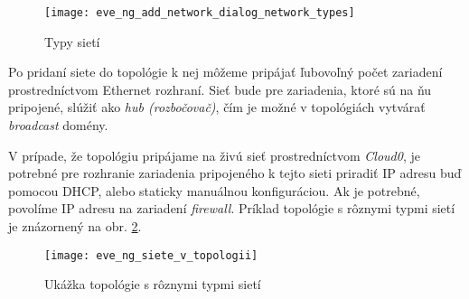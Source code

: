 \begin{figure}
    \centering
    \texttt{[image: eve\_ng\_add\_network\_dialog\_network\_types]}
    \caption{Typy sietí}
    \label{obr:eve_ng_add_network_dialog_network_types}
\end{figure}

Po pridaní siete do topológie k nej môžeme pripájať ľubovoľný počet zariadení prostredníctvom Ethernet rozhraní. Sieť bude pre zariadenia, ktoré sú na ňu pripojené, slúžiť ako \emph{hub (rozbočovač)}, čím je možné v topológiách vytvárať \emph{broadcast} domény.

V prípade, že topológiu pripájame na živú sieť prostredníctvom \emph{Cloud0}, je potrebné pre rozhranie zariadenia pripojeného k tejto sieti priradiť IP adresu buď pomocou DHCP, alebo staticky manuálnou konfiguráciou. Ak je potrebné, povolíme IP adresu na zariadení \emph{firewall}. Príklad topológie s rôznymi typmi sietí je znázornený na obr. \ref{obr:eve_ng_siete_v_topologii}.

\begin{figure}
    \centering
    \texttt{[image: eve\_ng\_siete\_v\_topologii]}
    \caption{Ukážka topológie s rôznymi typmi sietí}
    \label{obr:eve_ng_siete_v_topologii}
\end{figure}